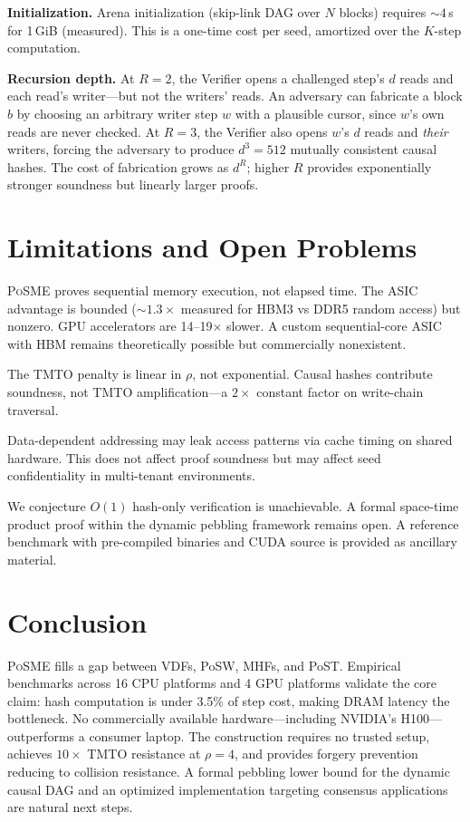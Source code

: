 \documentclass[conference,twocolumn]{IEEEtran}
\newcommand{\posme}{\textsc{PoSME}}
\begin{document}
\textbf{Initialization.} Arena initialization (skip-link DAG over
$N$ blocks) requires ${\sim}4$\,s for 1\,GiB (measured). This is
a one-time cost per seed, amortized over the $K$-step computation.

\textbf{Recursion depth.} At $R{=}2$, the Verifier opens a
challenged step's $d$ reads and each read's writer---but not the
writers' reads. An adversary can fabricate a block $b$ by choosing
an arbitrary writer step $w$ with a plausible cursor, since $w$'s
own reads are never checked. At $R{=}3$, the Verifier also opens
$w$'s $d$ reads and \emph{their} writers, forcing the adversary
to produce $d^3{=}512$ mutually consistent causal hashes. The
cost of fabrication grows as $d^R$; higher $R$ provides
exponentially stronger soundness but linearly larger proofs.

\section{Limitations and Open Problems}

\posme{} proves sequential memory execution, not elapsed time.
The ASIC advantage is bounded (${\sim}1.3{\times}$ measured
for HBM3 vs DDR5 random access) but nonzero. GPU accelerators
are 14--19${\times}$ slower. A custom sequential-core ASIC with
HBM remains theoretically possible but commercially nonexistent.

The TMTO penalty is linear in $\rho$, not exponential. Causal
hashes contribute soundness, not TMTO amplification---a
$2{\times}$ constant factor on write-chain traversal.

Data-dependent addressing may leak access patterns via cache
timing on shared hardware. This does not affect proof soundness
but may affect seed confidentiality in multi-tenant environments.

We conjecture $O(1)$ hash-only verification is unachievable.
A formal space-time product proof within the dynamic pebbling
framework remains open. A reference benchmark with pre-compiled
binaries and CUDA source is provided as ancillary material.

\section{Conclusion}

\posme{} fills a gap between VDFs, PoSW, MHFs, and PoST.
Empirical benchmarks across 16 CPU platforms and 4 GPU platforms
validate the core claim: hash computation is under 3.5\% of step
cost, making DRAM latency the bottleneck. No commercially
available hardware---including NVIDIA's H100---outperforms a
consumer laptop. The construction requires no trusted setup,
achieves $10{\times}$ TMTO resistance at $\rho{=}4$, and
provides forgery prevention reducing to collision resistance.
A formal pebbling lower bound for the dynamic causal DAG and an
optimized implementation targeting consensus applications are
natural next steps.
\end{document}
